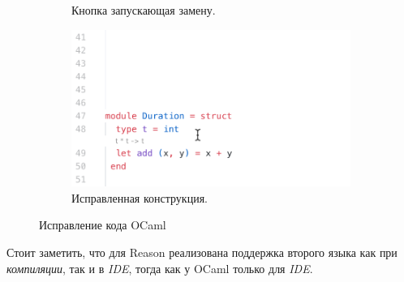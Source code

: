 \begin{figure}[h]
\begin{subfigure}{0.5\textwidth}
		\caption{Кнопка запускающая замену.}
	\end{subfigure}
	\begin{subfigure}{0.5\textwidth}
		\includegraphics[width=\linewidth]{screenshots/04.png}
		\caption{Исправленная конструкция.}
	\end{subfigure}
\caption{Исправление кода OCaml}
\end{figure}

Стоит заметить, что для Reason реализована поддержка второго языка как при {\it компиляции}, так и в {\it IDE}, тогда как у OCaml только для {\it IDE}. 

\newpage

